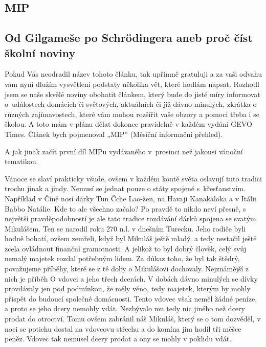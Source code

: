 \documentclass[12pt, a4paper]{article}
\begin{document}
	\begin{multicols*}{2}
		\setlength{\columnseprule}{1pt}

		\begin{center}\section*{MIP}\end{center}
		\subsection*{Od Gilgameše po Schrödingera aneb proč číst školní noviny}

		Pokud Vás neodradil název tohoto článku, tak upřímně
		gratuluji a za vaši odvahu vám nyní dlužím vysvětlení
		podstaty několika vět, které hodlám napsat. Rozhodl
		jsem se naše skvělé noviny obohatit článkem, který
		bude do jisté míry informovat o~událostech domácích či
		světových, aktuálních či již dávno minulých, zkrátka o
		různých zajímavostech, které vám mohou rozšířit vaše
		obzory a pomoci třeba i se školou. A toto mám v plánu
		dělat dokonce pravidelně v každém vydání GEVO
		Times. Článek bych pojmenoval „MIP” (Měsíční informační
		přehled).

		A jak jinak začít první díl MIPu vydávaného v~prosinci 
		než jakousi vánoční tematikou.

		Vánoce se slaví prakticky všude, ovšem v každém koutě
		světa oslavují tuto tradici trochu jinak a jindy. Nemusí
		se jednat pouze o státy spojené s~křesťanstvím.
		Například v Číně nosí dárky Tun Čche Lao-žen, na Havaji
		Kanakaloka a v Itálii Babbo Natálie. Kde to ale všechno
		začalo? Po pravdě to nikdo neví přesně, s největší
		pravděpodobností je ale tato tradice rozdávání dárků
		spojena se svatým Mikulášem. Ten se narodil roku 270
		n.l. v dnešním Turecku. Jeho rodiče byli hodně bohatí,
		ovšem zemřeli, když byl Mikuláš ještě mladý, a tedy
		nestačil ještě zcela ovládnout finanční gramotnosti. A jelikož
		to byl dobrý člověk, celý svůj nemalý majetek rozdal
		potřebným lidem. Za důkaz toho, že byl tak štědrý,
		považujeme příběhy, které se z té doby o Mikulášovi
		dochovaly. Nejznámější z nich je příběh O vdovci a jeho
		třech dcerách. V dobách dávno minulých se dívky
		provdávaly jen pod podmínkou, že měly věno, tedy
		majetek, kterým by mohly přispět do budoucí společné
		domácnosti. Tento vdovec však neměl žádné peníze, a
		proto se jeho dcery nemohly vdát. Nezbývalo mu tedy
		nic jiného než dcery prodat do otroctví. Tomu ovšem
		zabránil náš Mikuláš, který se o tom dozvěděl, v noci se
		potichu dostal na vdovcovu střechu a do komína jim
		hodil tři měšce peněz. Vdovec tak nemusel dcery
		prodat a ony se mohly v poklidu vdát.


\end{multicols*}
\end{document}
